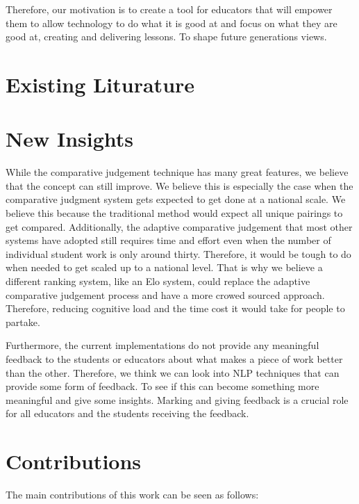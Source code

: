 	Therefore, our motivation is to create a tool for educators that will empower them to allow technology to do what it is good at and focus on what they are good at, creating and delivering lessons. To shape future generations views.




	\section{Existing Liturature}
	
	\section{New Insights}
	While the comparative judgement technique has many great features, we believe that the concept can still improve. We believe this is especially the case when the comparative judgment system gets expected to get done at a national scale. We believe this because the traditional method would expect all unique pairings to get compared. Additionally, the adaptive comparative judgement that most other systems have adopted still requires time and effort even when the number of individual student work is only around thirty. Therefore, it would be tough to do when needed to get scaled up to a national level. That is why we believe a different ranking system, like an Elo system, could replace the adaptive comparative judgement process and have a more crowed sourced approach. Therefore, reducing cognitive load and the time cost it would take for people to partake. 
	
	Furthermore, the current implementations do not provide any meaningful feedback to the students or educators about what makes a piece of work better than the other. Therefore, we think we can look into NLP techniques that can provide some form of feedback. To see if this can become something more meaningful and give some insights. Marking and giving feedback is a crucial role for all educators and the students receiving the feedback.


	\section{Contributions} 
		\label{sec:intro_contribs} 

		The main contributions of this work can be seen as follows:

